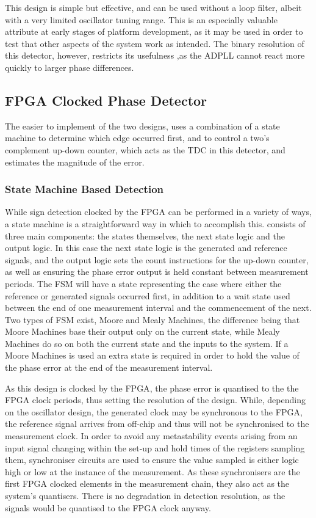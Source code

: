 This design is simple but effective, and can be used without a loop filter, albeit with a very limited oscillator tuning range. This is an especially valuable attribute at early stages of platform development, as it may be used in order to test that other aspects of the system work as intended. The binary resolution of this detector, however, restricts its usefulness ,as the \ac{ADPLL} cannot react more quickly to larger phase differences.

\subsection{\acs{FPGA} Clocked Phase Detector}
The easier to implement of the two designs, uses a combination of a state machine to determine which edge occurred first, and to control a two's complement up-down counter, which acts as the \ac{TDC} in this detector, and estimates the magnitude of the error.

\subsubsection{State Machine Based Detection}
While sign detection clocked by the \ac{FPGA} can be performed in a variety of ways, a state machine is a straightforward way in which to accomplish this.  consists of three main components: the states themselves, the next state logic and the output logic. In this case the next state logic is the generated and reference signals, and the output logic sets the count instructions for the up-down counter, as well as ensuring the phase error output is held constant between measurement periods. The \ac{FSM} will have a state representing the case where either the reference or generated signals occurred first, in addition to a wait state used between the end of one measurement interval and the commencement of the next. Two types of \ac{FSM} exist, Moore and Mealy Machines, the difference being that Moore Machines base their output only on the current state, while Mealy Machines do so on both the current state and the inputs to the system. If a Moore Machines is used an extra state is required in order to hold the value of the phase error at the end of the measurement interval.

As this design is clocked by the \ac{FPGA}, the phase error is quantised to the the \ac{FPGA} clock periods, thus setting the resolution of the design. While, depending on the oscillator design, the generated clock may be synchronous to the \ac{FPGA}, the reference signal arrives from off-chip and thus will not be synchronised to the measurement clock. In order to avoid any metastability events arising from an input signal changing within the set-up and hold times of the registers sampling them, synchroniser circuits are used to ensure the value sampled is either logic high or low at the instance of the measurement. As these synchronisers are the first \ac{FPGA} clocked elements in the measurement chain, they also act as the system's quantisers. There is no degradation in detection resolution, as the signals would be quantised to the \ac{FPGA} clock anyway.

